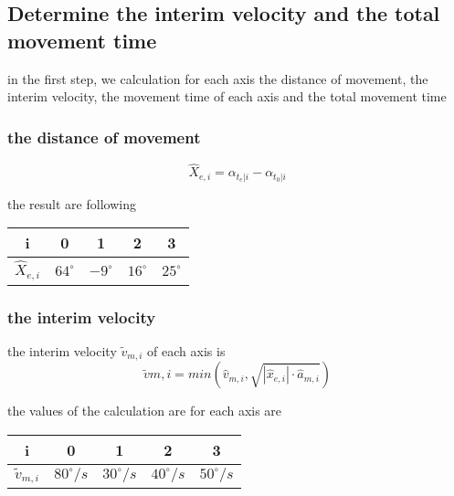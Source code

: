\documentclass[%
  professionalfonts,%
  xcolor={%
    usenames,%
    dvipsnames,%
    svgnames,%
    table,%
    hyperref%
  }%
]{beamer}
\begin{document}
\subsection{Determine the interim velocity and the total movement time}
\begin{frame}
in the first step, we calculation for each axis the distance of movement, the interim velocity, the movement time of each axis and the total movement time

\subsubsection*{the distance of movement }
\begin{equation*}
\hat{X}_{e,i} = {\alpha_{t_{e}|i} - \alpha_{t_{0}|i}}
\end{equation*}

the result are following    
\begin{center}
\begin{tabular}{ccccc}
\toprule
i & 0 & 1 & 2 & 3 \\
\midrule
$\hat{X}_{e,i}$ & $ 64^\circ$ & $ -9^\circ$ & $16^\circ$ & $25^\circ$ \\
\bottomrule 
\end{tabular}
\end{center}
\end{frame}

\subsubsection*{the interim velocity}
\begin{frame}
the interim velocity $\tilde{v}_{m,i}$ of each axis is 
\begin{equation*}
\tilde{v}{m,i} = min\left(\hat{v}_{m,i},\sqrt{|\hat{x}_{e,i}| \cdot \hat{a}_{m,i}} \right) 
\end{equation*}

the values of the calculation are for each axis are
\begin{center}
\begin{tabular}{ccccc}
\toprule
i & 0 & 1 & 2 & 3 \\
\midrule
$\tilde{v}_{m,i}$ & $80^\circ/s$ & $30^\circ/s$ & $40^\circ/s$ & $50^\circ/s$ \\
\bottomrule
\end{tabular}               
\end{center}  
\end{frame}
\end{document}
